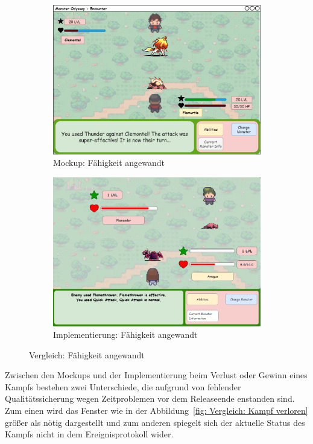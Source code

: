\begin{figure}[H]
    \centering
    \begin{subfigure}[b]{0.4\textwidth}
        \includegraphics[width=\textwidth]{images/mockups/Encounter/Encounter1v1AbilitiesUsed.png}
        \caption{Mockup: \phantom{gewandt} Fähigkeit angewandt}
        \label{fig: Mockup: Fähigkeit auf das gegnerische Monster angewandt}
    \end{subfigure}
    \hfill
    \begin{subfigure}[b]{0.4\textwidth}
        \includegraphics[width=\textwidth]{images/implementation/Encounter/abilitiesused.PNG}
        \caption{Implementierung: Fähigkeit angewandt}
        \label{fig: Implementierung: Fähigkeit auf das gegnerische Monster angewandt}
    \end{subfigure}
    \caption{Vergleich: Fähigkeit angewandt}
    \label{fig: Vergleich: Fähigkeit auf das gegnerische Monster angewandt}
\end{figure}
Zwischen den Mockups und der Implementierung beim Verlust oder Gewinn eines Kampfs bestehen zwei Unterschiede, die aufgrund von fehlender Qualitätssicherung wegen Zeitproblemen vor dem Releaseende enstanden sind. Zum einen wird das Fenster wie in der Abbildung~\ref{fig: Vergleich: Kampf verloren} größer als nötig dargestellt und zum anderen spiegelt sich der aktuelle Status des Kampfs nicht in dem Ereignisprotokoll wider.

